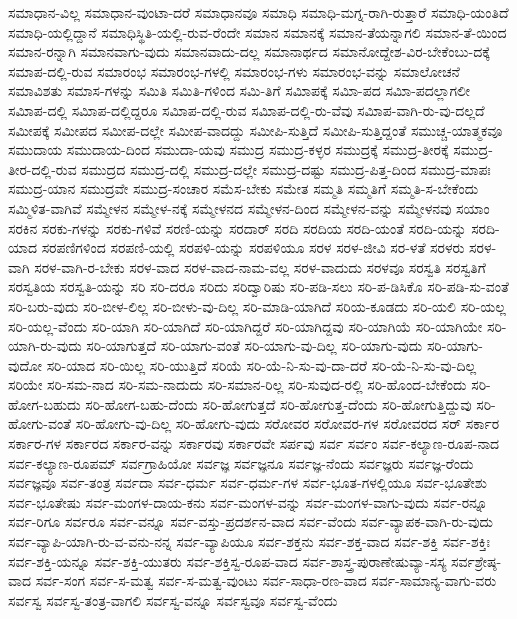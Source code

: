{ಸಮಾಧಾನ-ವಿಲ್ಲ
ಸಮಾಧಾನ-ವುಂಟಾ-ದರೆ
ಸಮಾಧಾನವೂ
ಸಮಾಧಿ
ಸಮಾಧಿ-ಮಗ್ನ-ರಾಗಿ-ರುತ್ತಾರೆ
ಸಮಾಧಿ-ಯಂತಿದೆ
ಸಮಾಧಿ-ಯಲ್ಲಿದ್ದಾನೆ
ಸಮಾಧಿಸ್ಥಿತಿ-ಯಲ್ಲಿ-ರುವ-ರೆಂದೇ
ಸಮಾನ
ಸಮಾನಕ್ಕೆ
ಸಮಾನ-ತೆಯನ್ನಾಗಲಿ
ಸಮಾನ-ತೆ-ಯಿಂದ
ಸಮಾನ-ರನ್ನಾಗಿ
ಸಮಾನವಾಗು-ವುದು
ಸಮಾನವಾದು-ದಲ್ಲ
ಸಮಾನಾರ್ಥದ
ಸಮಾನೋದ್ದೇಶ-ವಿರ-ಬೇಕೆಂಬು-ದಕ್ಕೆ
ಸಮಾಪ-ದಲ್ಲಿ-ರುವ
ಸಮಾರಂಭ
ಸಮಾರಂಭ-ಗಳಲ್ಲಿ
ಸಮಾರಂಭ-ಗಳು
ಸಮಾರಂಭ-ವನ್ನು
ಸಮಾಲೋಚನೆ
ಸಮಾವಿಶತು
ಸಮಾಸ-ಗಳನ್ನು
ಸಮಿತಿ
ಸಮಿತಿ-ಗಳಿಂದ
ಸಮಿ-ತಿಗೆ
ಸಮಿಾಪಕ್ಕೆ
ಸಮಿಾ-ಪದ
ಸಮಿಾ-ಪದಲ್ಲಾಗಲೀ
ಸಮಿಾಪ-ದಲ್ಲಿ
ಸಮಿಾಪ-ದಲ್ಲಿದ್ದರೂ
ಸಮಿಾಪ-ದಲ್ಲಿ-ರುವ
ಸಮಿಾಪ-ದಲ್ಲಿ-ರು-ವೆವು
ಸಮಿಾಪ-ವಾಗಿ-ರು-ವು-ದಲ್ಲದೆ
ಸಮೀಪಕ್ಕೆ
ಸಮೀಪದ
ಸಮೀಪ-ದಲ್ಲೇ
ಸಮೀಪ-ವಾದದ್ದು
ಸಮೀಪಿ-ಸುತ್ತಿದೆ
ಸಮೀಪಿ-ಸುತ್ತಿದ್ದಂತೆ
ಸಮುಚ್ಚ-ಯಾತ್ಮಕವೂ
ಸಮುದಾಯ
ಸಮುದಾಯ-ದಿಂದ
ಸಮುದಾ-ಯವು
ಸಮುದ್ರ
ಸಮುದ್ರ-ಕಳ್ಳರ
ಸಮುದ್ರಕ್ಕೆ
ಸಮುದ್ರ-ತೀರಕ್ಕೆ
ಸಮುದ್ರ-ತೀರ-ದಲ್ಲಿ-ರುವ
ಸಮುದ್ರದ
ಸಮುದ್ರ-ದಲ್ಲಿ
ಸಮುದ್ರ-ದಲ್ಲೇ
ಸಮುದ್ರ-ದಷ್ಟು
ಸಮುದ್ರ-ಪಿತ್ತ-ದಿಂದ
ಸಮುದ್ರ-ಮಾಪಃ
ಸಮುದ್ರ-ಯಾನ
ಸಮುದ್ರವೇ
ಸಮುದ್ರ-ಸಂಚಾರ
ಸಮೆಸ-ಬೇಕು
ಸಮೇತ
ಸಮ್ಮತಿ
ಸಮ್ಮತಿಗೆ
ಸಮ್ಮತಿ-ಸ-ಬೇಕೆಂದು
ಸಮ್ಮಿಳಿತ-ವಾಗಿವೆ
ಸಮ್ಮೇಳನ
ಸಮ್ಮೇಳ-ನಕ್ಕೆ
ಸಮ್ಮೇಳನದ
ಸಮ್ಮೇಳನ-ದಿಂದ
ಸಮ್ಮೇಳನ-ವನ್ನು
ಸಮ್ಮೇಳನವು
ಸಯಾಂ
ಸರಕಿನ
ಸರಕು-ಗಳನ್ನು
ಸರಕು-ಗಳಿವೆ
ಸರಣಿ-ಯನ್ನು
ಸರದಾರ್
ಸರದಿ
ಸರದಿಯ
ಸರದಿ-ಯಂತೆ
ಸರದಿ-ಯನ್ನು
ಸರದಿ-ಯಾದ
ಸರಪಣಿಗಳಿಂದ
ಸರಪಣಿ-ಯಲ್ಲಿ
ಸರಪಳಿ-ಯನ್ನು
ಸರಪಳಿಯೂ
ಸರಳ
ಸರಳ-ಜೀವಿ
ಸರ-ಳತೆ
ಸರಳರು
ಸರಳ-ವಾಗಿ
ಸರಳ-ವಾಗಿ-ರ-ಬೇಕು
ಸರಳ-ವಾದ
ಸರಳ-ವಾದ-ನಾಮ-ವಲ್ಲ
ಸರಳ-ವಾದುದು
ಸರಳವೂ
ಸರಸ್ವತಿ
ಸರಸ್ವತಿಗೆ
ಸರಸ್ವತಿಯ
ಸರಸ್ವತಿ-ಯನ್ನು
ಸರಿ
ಸರಿ-ದರೂ
ಸರಿದು
ಸರಿದ್ವಾರಿಷು
ಸರಿ-ಪಡಿ-ಸಲು
ಸರಿ-ಪ-ಡಿಸಿಕೊ
ಸರಿ-ಪಡಿ-ಸು-ವಂತೆ
ಸರಿ-ಬರು-ವುದು
ಸರಿ-ಬೀಳ-ಲಿಲ್ಲ
ಸರಿ-ಬೀಳು-ವು-ದಿಲ್ಲ
ಸರಿ-ಮಾಡಿ-ಯಾಗಿದೆ
ಸರಿಯ-ಕೂಡದು
ಸರಿ-ಯಲಿ
ಸರಿ-ಯಲ್ಲ
ಸರಿ-ಯಲ್ಲ-ವೆಂದು
ಸರಿ-ಯಾಗಿ
ಸರಿ-ಯಾಗಿದೆ
ಸರಿ-ಯಾಗಿದ್ದರೆ
ಸರಿ-ಯಾಗಿದ್ದವು
ಸರಿ-ಯಾಗಿಯೆ
ಸರಿ-ಯಾಗಿಯೇ
ಸರಿ-ಯಾಗಿ-ರು-ವುದು
ಸರಿ-ಯಾಗುತ್ತದೆ
ಸರಿ-ಯಾಗು-ವಂತೆ
ಸರಿ-ಯಾಗು-ವು-ದಿಲ್ಲ
ಸರಿ-ಯಾಗು-ವುದು
ಸರಿ-ಯಾಗು-ವುದೋ
ಸರಿ-ಯಾದ
ಸರಿ-ಯಿಲ್ಲ
ಸರಿ-ಯುತ್ತಿದೆ
ಸರಿಯೆ
ಸರಿ-ಯೆ-ನಿ-ಸು-ವು-ದಾ-ದರೆ
ಸರಿ-ಯೆ-ನಿ-ಸು-ವು-ದಿಲ್ಲ
ಸರಿಯೇ
ಸರಿ-ಸಮ-ನಾದ
ಸರಿ-ಸಮ-ನಾದುದು
ಸರಿ-ಸಮಾನ-ರಿಲ್ಲ
ಸರಿ-ಸುವುದ-ರಲ್ಲಿ
ಸರಿ-ಹೊಂದ-ಬೇಕೆಂದು
ಸರಿ-ಹೋಗ-ಬಹುದು
ಸರಿ-ಹೋಗ-ಬಹು-ದೆಂದು
ಸರಿ-ಹೋಗುತ್ತದೆ
ಸರಿ-ಹೋಗುತ್ತ-ದೆಂದು
ಸರಿ-ಹೋಗುತ್ತಿದ್ದುವು
ಸರಿ-ಹೋಗು-ವಂತೆ
ಸರಿ-ಹೋಗು-ವು-ದಿಲ್ಲ
ಸರಿ-ಹೋಗು-ವುದು
ಸರೋವರ
ಸರೋವರ-ಗಳ
ಸರೋವರದ
ಸರ್
ಸರ್ಕಾರ
ಸರ್ಕಾರ-ಗಳ
ಸರ್ಕಾರದ
ಸರ್ಕಾರ-ವನ್ನು
ಸರ್ಕಾರವು
ಸರ್ಕಾರವೇ
ಸರ್ಪವು
ಸರ್ವ
ಸರ್ವಂ
ಸರ್ವ-ಕಲ್ಯಾಣ-ರೂಪ-ನಾದ
ಸರ್ವ-ಕಲ್ಯಾಣ-ರೂಪಮ್
ಸರ್ವಗ್ರಾಹಿಯೋ
ಸರ್ವಜ್ಞ
ಸರ್ವಜ್ಞನೂ
ಸರ್ವಜ್ಞ-ನೆಂದು
ಸರ್ವಜ್ಞರು
ಸರ್ವಜ್ಞ-ರೆಂದು
ಸರ್ವಜ್ಞವೂ
ಸರ್ವ-ತಂತ್ರ
ಸರ್ವದಾ
ಸರ್ವ-ಧರ್ಮ
ಸರ್ವ-ಧರ್ಮ-ಗಳ
ಸರ್ವ-ಭೂತ-ಗಳಲ್ಲಿಯೂ
ಸರ್ವ-ಭೂತೇಶು
ಸರ್ವ-ಭೂತೇಷು
ಸರ್ವ-ಮಂಗಳ-ದಾಯ-ಕನು
ಸರ್ವ-ಮಂಗಳ-ವನ್ನು
ಸರ್ವ-ಮಂಗಳ-ವಾಗು-ವುದು
ಸರ್ವ-ರನ್ನೂ
ಸರ್ವ-ರಿಗೂ
ಸರ್ವರೂ
ಸರ್ವ-ವನ್ನೂ
ಸರ್ವ-ವಸ್ತು-ಪ್ರದರ್ಶನ-ವಾದ
ಸರ್ವ-ವೆಂದು
ಸರ್ವ-ವ್ಯಾಪಕ-ವಾಗಿ-ರು-ವುದು
ಸರ್ವ-ವ್ಯಾಪಿ-ಯಾಗಿ-ರು-ವ-ವನು-ನನ್ನ
ಸರ್ವ-ವ್ಯಾಪಿಯೂ
ಸರ್ವ-ಶಕ್ತನು
ಸರ್ವ-ಶಕ್ತ-ವಾದ
ಸರ್ವ-ಶಕ್ತಿ
ಸರ್ವ-ಶಕ್ತಿಃ
ಸರ್ವ-ಶಕ್ತಿ-ಯನ್ನೂ
ಸರ್ವ-ಶಕ್ತಿ-ಯುತರು
ಸರ್ವ-ಶಕ್ತಿಸ್ವ-ರೂಪ-ವಾದ
ಸರ್ವ-ಶಾಸ್ತ್ರ-ಪುರಾಣೇಷುವ್ಯಾ-ಸಸ್ಯ
ಸರ್ವಶ್ರೇಷ್ಠ-ವಾದ
ಸರ್ವ-ಸಂಗ
ಸರ್ವ-ಸ-ಮತ್ವ
ಸರ್ವ-ಸ-ಮತ್ವ-ವುಂಟು
ಸರ್ವ-ಸಾಧಾ-ರಣ-ವಾದ
ಸರ್ವ-ಸಾಮಾನ್ಯ-ವಾಗು-ವರು
ಸರ್ವಸ್ವ
ಸರ್ವಸ್ವ-ತಂತ್ರ-ವಾಗಲಿ
ಸರ್ವಸ್ವ-ವನ್ನೂ
ಸರ್ವಸ್ವವೂ
ಸರ್ವಸ್ವ-ವೆಂದು
}

